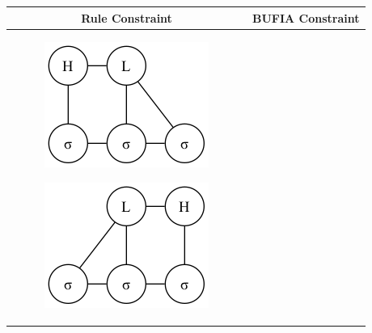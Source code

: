 \documentclass[11pt,letterpaper]{article}
\begin{document}
\begin{table}[ht]
	\centering
	\begin{tabular}{c|c}
		\hline
			Rule Constraint  & BUFIA Constraint \\
		\hline
		\begin{subfigure}{0.19\textwidth}
			\includegraphics[width=\textwidth]{hausacons/HLL.png}
			\caption{}
			\label{consHLL}
		\end{subfigure}
		\begin{subfigure}{0.19\textwidth}
			\includegraphics[width=\textwidth]{hausacons/LLH}
			\caption{}
			\label{consLLH}
		\end{subfigure}&
		\begin{subfigure}{0.19\textwidth}

\end{subfigure}
\end{tabular}
\end{table}
\end{document}

